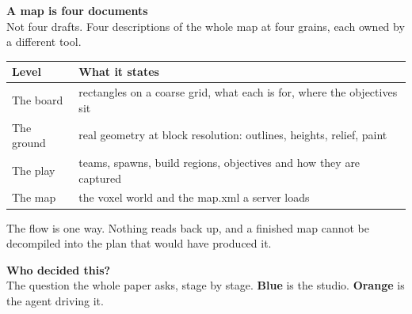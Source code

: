 \documentclass[a1paper,landscape]{article}
\newcommand{\id}[1]{{\ttfamily #1}}
\newcommand{\studio}[1]{\textcolor{studioC}{\textbf{#1}}}
\newcommand{\agent}[1]{\textcolor{agentC}{\textbf{#1}}}
\begin{document}
\noindent\begin{minipage}[t]{\textwidth}
\noindent
\begin{minipage}[t]{0.305\textwidth}
{\sffamily\Large\bfseries\color{ink} A map is four documents}\\[8pt]
{\color{ink60} Not four drafts. Four descriptions of the whole map at four grains,
each owned by a different tool.}\\[9pt]

\begin{tabularx}{\linewidth}{L{74mm} Y}
\toprule
\textbf{Level} & \textbf{What it states} \\
\midrule
The board & rectangles on a coarse grid, what each is for, where the objectives sit \\
The ground & real geometry at block resolution: outlines, heights, relief, paint \\
The play & teams, spawns, build regions, objectives and how they are captured \\
The map & the voxel world and the \id{map.xml} a server loads \\
\bottomrule
\end{tabularx}

\vspace{14pt}
{\color{ink60} The flow is one way. Nothing reads back up, and a finished map cannot
be decompiled into the plan that would have produced it.}
\end{minipage}
\hfill
\begin{minipage}[t]{0.305\textwidth}
{\sffamily\Large\bfseries\color{ink} Who decided this?}\\[8pt]
{\color{ink60} The question the whole paper asks, stage by stage.
\studio{Blue} is the studio. \agent{Orange} is the agent driving it.}\\[9pt]


\end{minipage}
\end{minipage}
\end{document}
